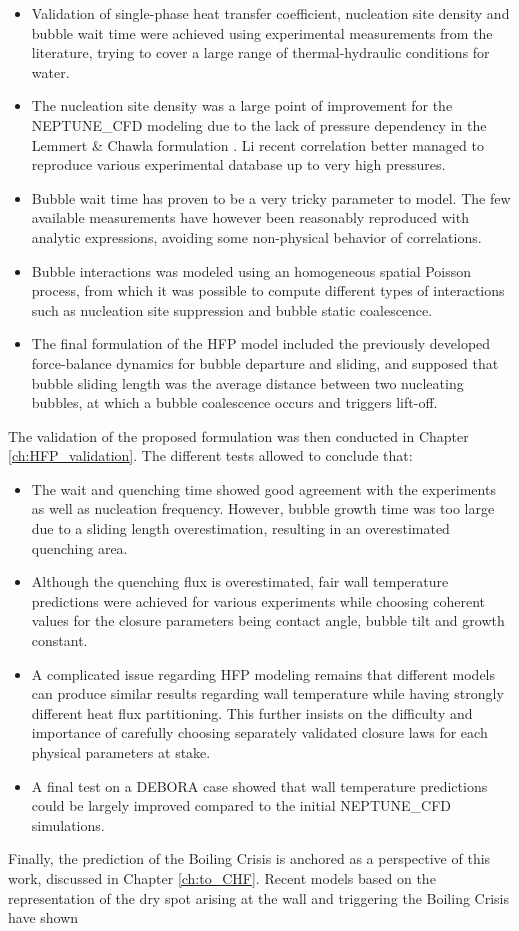 \begin{itemize}
\item Validation of single-phase heat transfer coefficient, nucleation site density and bubble wait time were achieved using experimental measurements from the literature, trying to cover a large range of thermal-hydraulic conditions for water.

\item The nucleation site density was a large point of improvement for the NEPTUNE\_CFD modeling due to the lack of pressure dependency in the Lemmert \& Chawla formulation \cite{lemmert_influence_1977}. Li \etal \cite{li_development_2018} recent correlation better managed to reproduce various experimental database up to very high pressures.

\item Bubble wait time has proven to be a very tricky parameter to model. The few available measurements have however been reasonably reproduced with analytic expressions, avoiding some non-physical behavior of correlations.

\item Bubble interactions was modeled using an homogeneous spatial Poisson process, from which it was possible to compute different types of interactions such as nucleation site suppression and bubble static coalescence. 

\item The final formulation of the HFP model included the previously developed force-balance dynamics for bubble departure and sliding, and supposed that bubble sliding length was the average distance between two nucleating bubbles, at which a bubble coalescence occurs and triggers lift-off.
\end{itemize}

The validation of the proposed formulation was then conducted in Chapter \ref{ch:HFP_validation}. The different tests allowed to conclude that:

\begin{itemize}
\item The wait and quenching time showed good agreement with the experiments as well as nucleation frequency. However, bubble growth time was too large due to a sliding length overestimation, resulting in an overestimated quenching area.
\item Although the quenching flux is overestimated, fair wall temperature predictions were achieved for various experiments while choosing coherent values for the closure parameters being contact angle, bubble tilt and growth constant.

\item A complicated issue regarding HFP modeling remains that different models can produce similar results regarding wall temperature while having strongly different heat flux partitioning. This further insists on the difficulty and importance of carefully choosing separately validated closure laws for each physical parameters at stake.

\item A final test on a DEBORA case showed that wall temperature predictions could be largely improved compared to the initial NEPTUNE\_CFD simulations.
\end{itemize}

Finally, the prediction of the Boiling Crisis is anchored as a perspective of this work, discussed in Chapter \ref{ch:to_CHF}. Recent models based on the representation of the dry spot arising at the wall and triggering the Boiling Crisis have shown 
